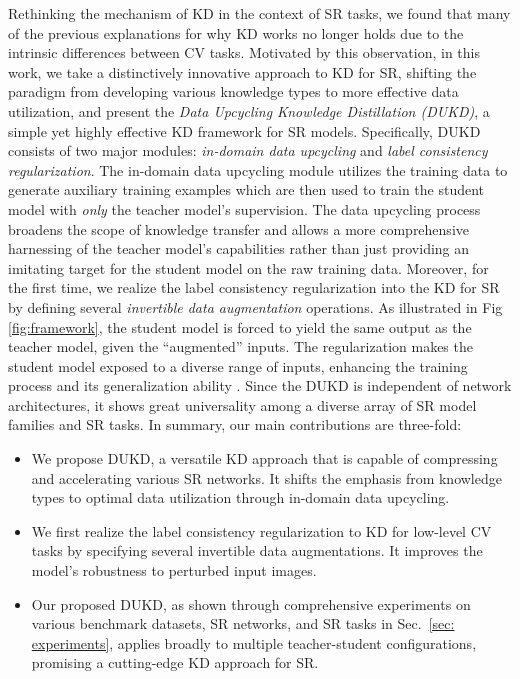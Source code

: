 \documentclass[10pt,twocolumn,letterpaper]{article}
\begin{document}
Rethinking the mechanism of KD in the context of SR tasks, we found that many of the previous explanations for why KD works no longer holds due to the intrinsic differences between CV tasks. Motivated by this observation, in this work, we take a distinctively innovative approach to KD for SR, shifting the paradigm from developing various knowledge types \cite{gou2021knowledge} to more effective data utilization, and present the \textit{Data Upcycling Knowledge Distillation (DUKD)}, a simple yet highly effective KD framework for SR models. 
Specifically, DUKD consists of two major modules: \textit{in-domain data upcycling} and \textit{label consistency regularization}. The in-domain data upcycling module utilizes the training data to generate auxiliary training examples which are then used to train the student model with \textit{only} the teacher model's supervision. The data upcycling process broadens the scope of knowledge transfer and allows a more comprehensive harnessing of the teacher model's capabilities rather than just providing an imitating target for the student model on the raw training data. Moreover, for the first time, we realize the label consistency regularization into the KD for SR by defining several \textit{invertible data augmentation} operations. As illustrated in Fig \ref{fig:framework}, the student model is forced to yield the same output as the teacher model, given the ``augmented'' inputs. The regularization makes the student model exposed to a diverse range of inputs, enhancing the training process and its generalization ability \cite{oliver2018realistic, jeong2019consistency, englesson2021consistency}.
Since the DUKD is independent of network architectures, it shows great universality among a diverse array of SR model families and SR tasks.
In summary, our main contributions are three-fold:
\begin{itemize}
	\item[] We propose DUKD, a versatile KD approach that is capable of compressing and accelerating various SR networks. It shifts the emphasis from knowledge types to optimal data utilization through in-domain data upcycling. \item[] We first realize the label consistency regularization to KD for low-level CV tasks by specifying several invertible data augmentations. It improves the model's robustness to perturbed input images.
	\item[] Our proposed DUKD, as shown through comprehensive experiments on various benchmark datasets, SR networks, and SR tasks in Sec.~\ref{sec: experiments}, applies broadly to multiple teacher-student configurations, promising a cutting-edge KD approach for SR. \end{itemize}
\end{document}
